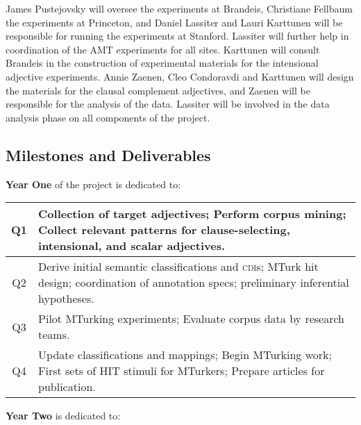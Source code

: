 \documentclass[10pt]{article}
\newcommand{\miniskip}{\vspace*{1mm}}
\begin{document}
James Pustejovsky will oversee the experiments at Brandeis, Christiane Fellbaum the experiments at Princeton, and Daniel Lassiter and Lauri Karttunen will be responsible for running the experiments at Stanford.  Lassiter will further help in coordination of the AMT experiments for all sites.  Karttunen will consult Brandeis in the construction of experimental materials for the intensional adjective experiments.  Annie Zaenen, Cleo Condoravdi and  Karttunen will design the materials for the clausal complement adjectives, and Zaenen will be responsible for the analysis of the data.  Lassiter will be involved in the data analysis phase on all components of the project. 


\vspace {-2mm}
\vspace {-2mm}


\subsection{Milestones and Deliverables}
\vspace {-1mm}


{\bf Year One} of the project is dedicated to: 

\vspace{1mm}\noindent
{\small
\begin{tabularx}{470pt}{|c|X|}

\hline

Q1 & Collection of target adjectives; Perform corpus mining;  Collect relevant patterns for clause-selecting, intensional, and scalar adjectives. 
\\
\hline

Q2 & Derive initial semantic classifications and \textsc{cdi}s; MTurk hit design; coordination of annotation specs; preliminary inferential hypotheses.
\\

\hline

Q3 & Pilot MTurking experiments;  Evaluate corpus data by research teams.    \\

\hline

Q4 & Update classifications and mappings; Begin MTurking work; First sets of HIT stimuli for MTurkers; Prepare articles for publication.     \\

\hline

\end{tabularx}
}

\miniskip\noindent
{\bf Year Two} is dedicated to: 
\end{document}
